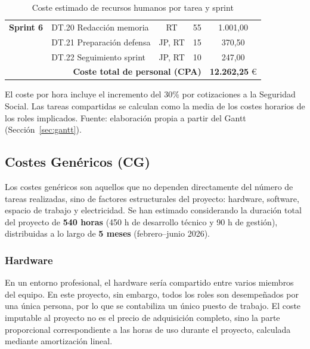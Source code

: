 \documentclass{article}
\begin{document}
\begin{table}[H]
\begin{tabular}{llccc}
    \midrule
    
    \textbf{Sprint 6} & DT.20 Redacción memoria & RT & 55 & 1.001,00 \\
    & DT.21 Preparación defensa & JP, RT & 15 & 370,50 \\
    & DT.22 Seguimiento sprint & JP, RT & 10 & 247,00 \\
    
    \midrule
    \multicolumn{4}{r}{\textbf{Coste total de personal (CPA)}} & \textbf{12.262,25} \euro \\
    \bottomrule
    
    \end{tabular}
    \caption{Coste estimado de recursos humanos por tarea y sprint}
    \label{tab:coste_sprints}
    \footnotesize
    El coste por hora incluye el incremento del 30\% por cotizaciones a la Seguridad Social.
    Las tareas compartidas se calculan como la media de los costes horarios de los roles implicados.
    Fuente: elaboración propia a partir del Gantt (Sección~\ref{sec:gantt}).
    \end{table}

    \subsection{Costes Genéricos (CG)}
    \normalsize
    \setlength{\parskip}{0.6em}
    \justify
    Los costes genéricos son aquellos que no dependen directamente del número de 
    tareas realizadas, sino de factores estructurales del proyecto: hardware, software, 
    espacio de trabajo y electricidad. Se han estimado considerando la duración total 
    del proyecto de \textbf{540 horas} (450 h de desarrollo técnico y 90 h de gestión), 
    distribuidas a lo largo de \textbf{5 meses} (febrero–junio 2026).

    \subsubsection{Hardware}
    \normalsize
    \setlength{\parskip}{0.6em}
    \justify
    En un entorno profesional, el hardware sería compartido entre varios miembros del 
    equipo. En este proyecto, sin embargo, todos los roles son desempeñados por una 
    única persona, por lo que se contabiliza un único puesto de trabajo. El coste 
    imputable al proyecto no es el precio de adquisición completo, sino la parte 
    proporcional correspondiente a las horas de uso durante el proyecto, calculada 
    mediante amortización lineal.
\end{document}
